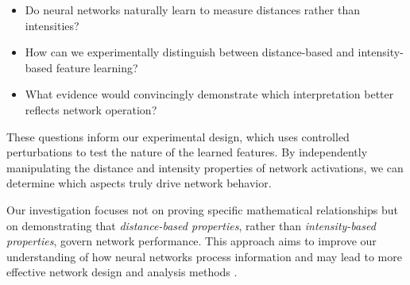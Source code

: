 \begin{itemize}
    \item Do neural networks naturally learn to measure distances rather than intensities?
    \item How can we experimentally distinguish between distance-based and intensity-based feature learning?
    \item What evidence would convincingly demonstrate which interpretation better reflects network operation?
\end{itemize}

These questions inform our experimental design, which uses controlled perturbations to test the nature of the learned features. By independently manipulating the distance and intensity properties of network activations, we can determine which aspects truly drive network behavior.

Our investigation focuses not on proving specific mathematical relationships but on demonstrating that \emph{distance-based properties}, rather than \emph{intensity-based properties}, govern network performance. This approach aims to improve our understanding of how neural networks process information and may lead to more effective network design and analysis methods \citep{montavon2018methods,samek2019explainable}.